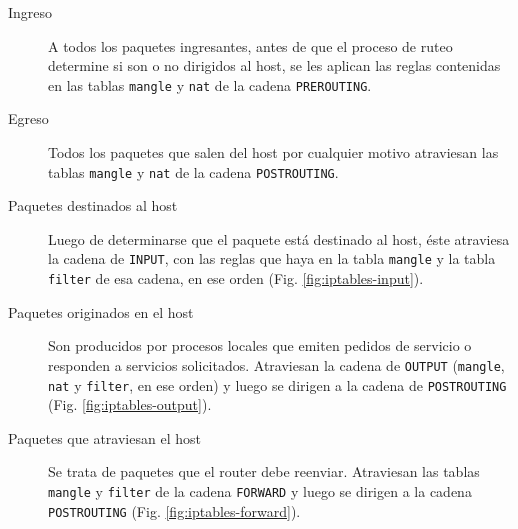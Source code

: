 \begin{description}
	\item[Ingreso] A todos los paquetes ingresantes, antes de que el proceso de ruteo determine si son o no dirigidos al host, se les aplican las reglas contenidas en las tablas \texttt{mangle} y \texttt{nat} de la cadena \texttt{PREROUTING}.
	\item[Egreso] Todos los paquetes que salen del host por cualquier motivo atraviesan las tablas \texttt{mangle} y \texttt{nat} de la cadena \texttt{POSTROUTING}. 
	\item[Paquetes destinados al host] Luego de determinarse que el paquete está destinado al host, éste atraviesa la cadena de \texttt{INPUT}, con las reglas que haya en la tabla \texttt{mangle} y la tabla \texttt{filter} de esa cadena, en ese orden (Fig. \ref{fig:iptables-input}). 
	\item[Paquetes originados en el host] Son producidos por procesos locales que emiten pedidos de servicio o responden a servicios solicitados. Atraviesan la cadena de \texttt{OUTPUT} (\texttt{mangle}, \texttt{nat} y \texttt{filter}, en ese orden) y luego se dirigen a la cadena de \texttt{POSTROUTING} (Fig. \ref{fig:iptables-output}). 
	\item[Paquetes que atraviesan el host] Se trata de paquetes que el router debe reenviar. Atraviesan las tablas \texttt{mangle} y \texttt{filter} de la cadena \texttt{FORWARD} y luego se dirigen a la cadena \texttt{POSTROUTING} (Fig. \ref{fig:iptables-forward}).
\end{description}


 
